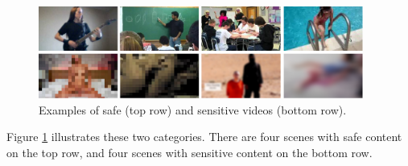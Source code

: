 \begin{figure}[!ht]
    \centering
    \includegraphics[width=0.95\textwidth]{img/safe-sensitive-horizontal.png}
    \caption{Examples of safe (top row) and sensitive videos (bottom row).}
    \label{fig:samples}
    \vspace{-1em}
\end{figure}

Figure \ref{fig:samples} illustrates these two categories.
There are four scenes with safe content on the top row, and four scenes with sensitive content on the bottom row.




